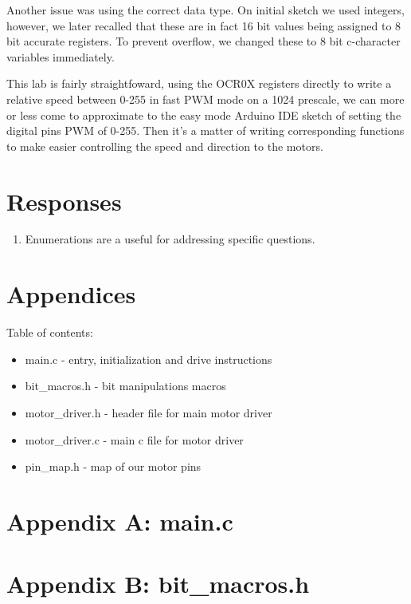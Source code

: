 \documentclass[letterpaper,11pt]{texMemo} %
\begin{document}
Another issue was using the correct data type. On initial sketch we used integers, 
however, we later recalled that these are in fact 16 bit values being assigned to 
8 bit accurate registers. To prevent overflow, we changed these to 8 bit c-character 
variables immediately.

This lab is fairly straightfoward, using the OCR0X registers directly to write a 
relative speed between 0-255 in fast PWM mode on a 1024 prescale, we can more or 
less come to approximate to the easy mode Arduino IDE sketch of setting the digital 
pins PWM of 0-255. Then it's a matter of writing corresponding functions to 
make easier controlling the speed and direction to the motors.

\section*{Responses}
\begin{enumerate}
\item Enumerations are a useful for addressing specific questions.
\end{enumerate} 

\newpage
\section*{Appendices}
Table of contents:
\begin{itemize}
    \item main.c - entry, initialization and drive instructions
    \item bit\_macros.h - bit manipulations macros
    \item motor\_driver.h - header file for main motor driver
    \item motor\_driver.c - main c file for motor driver
    \item pin\_map.h - map of our motor pins
\end{itemize}
\newpage

\section*{Appendix A: main.c}
\begin{tiny}

\end{tiny}
\newpage

\section*{Appendix B: bit\_macros.h}
\begin{tiny}

\end{tiny}
\newpage
\end{document}
